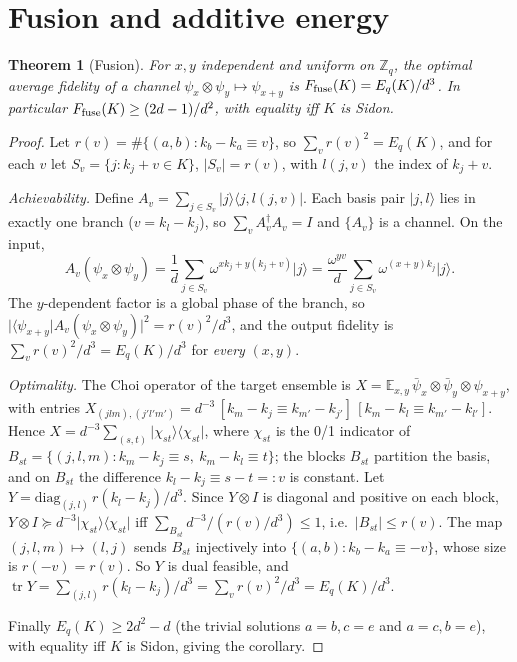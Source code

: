 \documentclass[11pt]{article}
\newcommand{\Z}{\mathbb{Z}}
\newcommand{\E}{\mathbb{E}}
\newcommand{\tr}{\operatorname{tr}}
\newcommand{\ket}[1]{\lvert #1\rangle}
\newcommand{\bra}[1]{\langle #1\rvert}
\newtheorem{theorem}{Theorem}
\theoremstyle{definition}
\theoremstyle{remark}
\begin{document}
\section{Fusion and additive energy}\label{sec:fusion}
\begin{theorem}[Fusion]\label{thm:fusion}
For $x,y$ independent and uniform on $\Z_q$, the optimal average fidelity of a channel $\psi_x\otimes\psi_y\mapsto\psi_{x+y}$ is
$F_{\rm fuse}(K)=E_q(K)/d^3$. In particular $F_{\rm fuse}(K)\ge(2d-1)/d^2$, with equality iff $K$ is Sidon.
\end{theorem}
\begin{proof}
Let $r(v)=\#\{(a,b):k_b-k_a\equiv v\}$, so $\sum_v r(v)^2=E_q(K)$, and for each $v$ let $S_v=\{j:k_j+v\in K\}$, $|S_v|=r(v)$, with
$l(j,v)$ the index of $k_j+v$.

\emph{Achievability.} Define $A_v=\sum_{j\in S_v}\ket j\bra{j,l(j,v)}$. Each basis pair $\ket{j,l}$ lies in exactly one branch
($v=k_l-k_j$), so $\sum_vA_v^\dagger A_v=I$ and $\{A_v\}$ is a channel. On the input,
\[
A_v(\psi_x\otimes\psi_y)=\frac1d\sum_{j\in S_v}\omega^{xk_j+y(k_j+v)}\ket j=\frac{\omega^{yv}}d\sum_{j\in S_v}\omega^{(x+y)k_j}\ket j .
\]
The $y$-dependent factor is a global phase of the branch, so $\big|\bra{\psi_{x+y}}A_v(\psi_x\otimes\psi_y)\big|^2=r(v)^2/d^3$, and the
output fidelity is $\sum_v r(v)^2/d^3=E_q(K)/d^3$ for \emph{every} $(x,y)$.

\emph{Optimality.} The Choi operator of the target ensemble is
$X=\E_{x,y}\,\bar\psi_x\otimes\bar\psi_y\otimes\psi_{x+y}$, with entries
$X_{(jlm),(j'l'm')}=d^{-3}\,[k_m-k_j\equiv k_{m'}-k_{j'}]\,[k_m-k_l\equiv k_{m'}-k_{l'}]$. Hence $X=d^{-3}\sum_{(s,t)}\ket{\chi_{st}}\bra{\chi_{st}}$,
where $\chi_{st}$ is the 0/1 indicator of $B_{st}=\{(j,l,m):k_m-k_j\equiv s,\ k_m-k_l\equiv t\}$; the blocks $B_{st}$ partition the basis,
and on $B_{st}$ the difference $k_l-k_j\equiv s-t=:v$ is constant. Let $Y=\mathrm{diag}_{(j,l)}\,r(k_l-k_j)/d^3$. Since $Y\otimes I$ is
diagonal and positive on each block, $Y\otimes I\succeq d^{-3}\ket{\chi_{st}}\bra{\chi_{st}}$ iff $\sum_{B_{st}}d^{-3}/(r(v)/d^3)\le1$, i.e.\
$|B_{st}|\le r(v)$. The map $(j,l,m)\mapsto(l,j)$ sends $B_{st}$ injectively into $\{(a,b):k_b-k_a\equiv -v\}$, whose size is
$r(-v)=r(v)$. So $Y$ is dual feasible, and $\tr Y=\sum_{(j,l)}r(k_l-k_j)/d^3=\sum_vr(v)^2/d^3=E_q(K)/d^3$.

Finally $E_q(K)\ge2d^2-d$ (the trivial solutions $a=b,c=e$ and $a=c,b=e$), with equality iff $K$ is Sidon, giving the corollary.
\end{proof}
\end{document}
